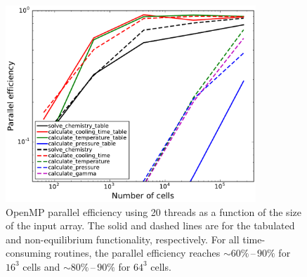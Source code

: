 \begin{figure}
  \centering
  \includegraphics[width=0.84\textwidth]{fig__openmp_performance.pdf}
  \caption{
    OpenMP parallel efficiency using 20 threads as a function of the size of
    the input array. The solid and dashed lines are for the tabulated and
    non-equilibrium functionality, respectively. For all time-consuming
    routines, the parallel efficiency reaches $\sim 60\%\,\text{--}\,90\%$
    for $16^3$ cells and $\sim 80\%\,\text{--}\,90\%$ for $64^3$ cells.
  } \label{fig:omp-perf}
\end{figure}
